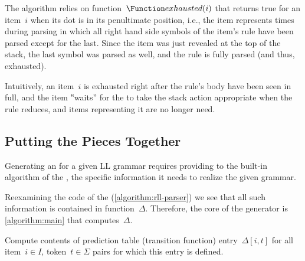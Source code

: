 \begin{algorithm}[htb]
\begin{itemize}
          The algorithm relies on function~$\Function exhausted(i)$ that returns
          true for an item~$i$ when its dot is in its penultimate position,
          i.e., the item represents times during parsing in which all
          right hand side symbols of the item's rule have been parsed except for the last.
          Since the item was just revealed at the top of the stack, the last symbol
          was parsed as well, and the rule is fully parsed (and thus, exhausted).
          \par
          Intuitively, an item~$i$ is exhausted right after the rule's body
          have been seen in full, and the item ‟waits” for the \RLLp to take
          the stack action appropriate when the rule reduces, and items representing
          it are no longer need.
  \end{itemize}
\end{algorithm}

\subsection{Putting the Pieces Together}
Generating an \RLLp for a given LL grammar requires providing to the
built-in algorithm of the \RLLp, the specific information it needs to
realize the given grammar.

Reexamining the code of the \RLLp (\cref{algorithm:rll-parser})
we see that all such information is contained in
function~$Δ$.
Therefore, the core of the \RLLp generator is
\cref{algorithm:main} that computes~$Δ$.

\begin{algorithm}[H]
  \caption{\label{algorithm:main}
    Compute contents of prediction table
    (transition function) entry~$Δ[i,t]$
    for all item~$i∈I$, token~$t ∈Σ$ pairs
    for which this entry is defined.
  }
  \begin{algorithmic}
     
        \CONTINUE {}
      \FI
           
           
        \FI
      \ENDFOR %
    \ENDFOR %
  \end{algorithmic}
\end{algorithm}

